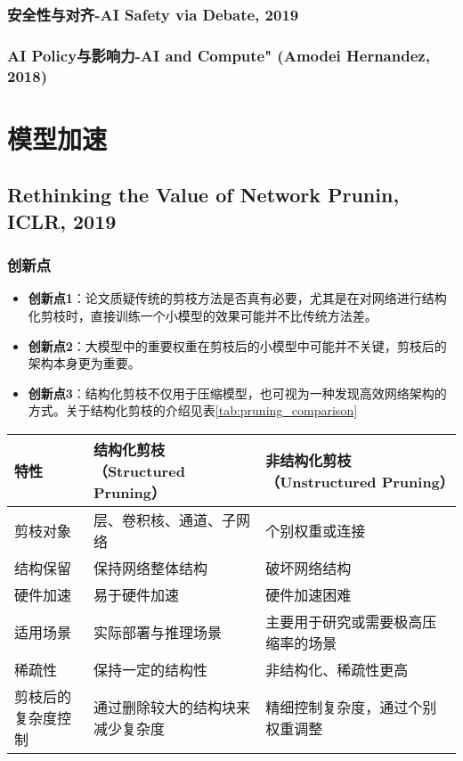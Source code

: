\documentclass[twocolumn, 10pt]{article} %
\begin{document}
\subsubsection{安全性与对齐-AI Safety via Debate, 2019}



\subsubsection{AI Policy与影响力-AI and Compute" (Amodei  Hernandez, 2018)}



\section{模型加速}
\subsection{Rethinking the Value of Network Prunin, ICLR, 2019}

\subsubsection{创新点}

\begin{itemize}[left=2em] %
    \item \textbf{创新点1}：论文质疑传统的剪枝方法是否真有必要，尤其是在对网络进行结构化剪枝时，直接训练一个小模型的效果可能并不比传统方法差。

    \item \textbf{创新点2}：大模型中的重要权重在剪枝后的小模型中可能并不关键，剪枝后的架构本身更为重要。

    \item \textbf{创新点3}：结构化剪枝不仅用于压缩模型，也可视为一种发现高效网络架构的方式。关于结构化剪枝的介绍见表\ref{tab:pruning_comparison}
\end{itemize}

\begin{table*}[h!]
    \centering
    \begin{tabular}{|m{4cm}|m{6cm}|m{6cm}|}
        \hline
        \textbf{特性} & \textbf{结构化剪枝（Structured Pruning）} & \textbf{非结构化剪枝（Unstructured Pruning）} \\ \hline
        剪枝对象 & 层、卷积核、通道、子网络 & 个别权重或连接 \\ \hline
        结构保留 & 保持网络整体结构 & 破坏网络结构 \\ \hline
        硬件加速 & 易于硬件加速 & 硬件加速困难 \\ \hline
        适用场景 & 实际部署与推理场景 & 主要用于研究或需要极高压缩率的场景 \\ \hline
        稀疏性 & 保持一定的结构性 & 非结构化、稀疏性更高 \\ \hline
        剪枝后的复杂度控制 & 通过删除较大的结构块来减少复杂度 & 精细控制复杂度，通过个别权重调整 \\ \hline
    \end{tabular}
    \caption{结构化剪枝与非结构化剪枝的对比}
    \label{tab:pruning_comparison}
\end{table*}
\end{document}
